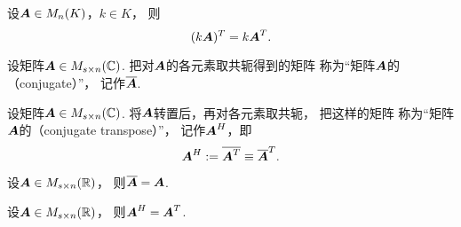 \begin{property}\label{theorem:矩阵的转置.性质3}
设\(\boldsymbol{A} \in M_n(K)\)，\(k \in K\)，
则\begin{equation}
	(k \boldsymbol{A})^T = k \boldsymbol{A}^T.
\end{equation}
\end{property}

\begin{definition}
设矩阵\(\boldsymbol{A} \in M_{s \times n}(\mathbb{C})\).
把对\(\boldsymbol{A}\)的各元素取共轭得到的矩阵
称为“矩阵\(\boldsymbol{A}\)的（conjugate）”，
记作\(\overline{\boldsymbol{A}}\).
\end{definition}

\begin{definition}
设矩阵\(\boldsymbol{A} \in M_{s \times n}(\mathbb{C})\).
将\(\boldsymbol{A}\)转置后，再对各元素取共轭，
把这样的矩阵
称为“矩阵\(\boldsymbol{A}\)的（conjugate transpose）”，
记作\(\boldsymbol{A}^H\)，即\begin{equation*}
    \boldsymbol{A}^H := \overline{\boldsymbol{A}^T} \equiv \overline{\boldsymbol{A}}^T.
\end{equation*}
\end{definition}

\begin{property}
设\(\boldsymbol{A} \in M_{s \times n}(\mathbb{R})\)，
则\(\overline{\boldsymbol{A}} = \boldsymbol{A}\).
\end{property}

\begin{property}
设\(\boldsymbol{A} \in M_{s \times n}(\mathbb{R})\)，
则\(\boldsymbol{A}^H = \boldsymbol{A}^T\).
\end{property}

